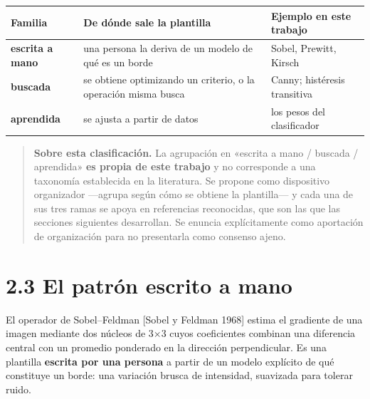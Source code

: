 \begin{longtable}[]{@{}
  >{\raggedright\arraybackslash}p{}
  >{\raggedright\arraybackslash}p{}
  >{\raggedright\arraybackslash}p{}@{}}
\toprule\noalign{}
\begin{minipage}[b]{\linewidth}\raggedright
Familia
\end{minipage} & \begin{minipage}[b]{\linewidth}\raggedright
De dónde sale la plantilla
\end{minipage} & \begin{minipage}[b]{\linewidth}\raggedright
Ejemplo en este trabajo
\end{minipage} \\
\midrule\noalign{}
\endhead
\bottomrule\noalign{}
\endlastfoot
\textbf{escrita a mano} & una persona la deriva de un modelo de qué es
un borde & Sobel, Prewitt, Kirsch \\
\textbf{buscada} & se obtiene optimizando un criterio, o la operación
misma busca & Canny; histéresis transitiva \\
\textbf{aprendida} & se ajusta a partir de datos & los pesos del
clasificador \\
\end{longtable}

\begin{quote}
\textbf{Sobre esta clasificación.} La agrupación en «escrita a mano /
buscada / aprendida» \textbf{es propia de este trabajo} y no corresponde
a una taxonomía establecida en la literatura. Se propone como
dispositivo organizador ---agrupa según cómo se obtiene la plantilla---
y cada una de sus tres ramas se apoya en referencias reconocidas, que
son las que las secciones siguientes desarrollan. Se enuncia
explícitamente como aportación de organización para no presentarla como
consenso ajeno.
\end{quote}

\section{2.3 El patrón escrito a
mano}\label{el-patruxf3n-escrito-a-mano}

El operador de Sobel--Feldman {[}Sobel y Feldman 1968{]} estima el
gradiente de una imagen mediante dos núcleos de 3×3 cuyos coeficientes
combinan una diferencia central con un promedio ponderado en la
dirección perpendicular. Es una plantilla \textbf{escrita por una
persona} a partir de un modelo explícito de qué constituye un borde: una
variación brusca de intensidad, suavizada para tolerar ruido.

